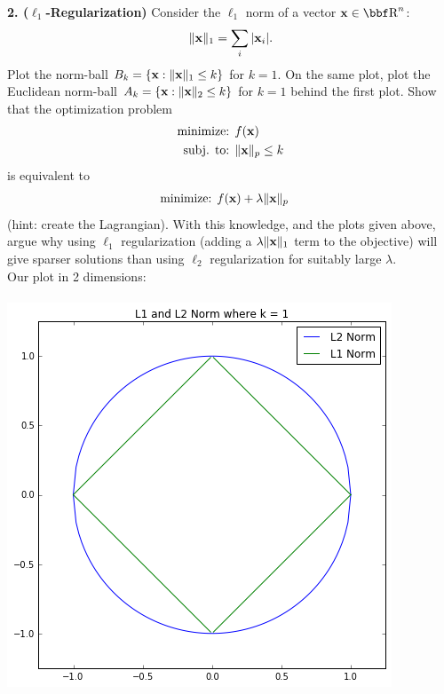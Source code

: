 \documentclass[12pt,letterpaper,fleqn]{hmcpset}
\begin{document}
\textbf{2. ($\ell_1$-Regularization)} Consider the $\ell_1$ norm of a vector $\xx\in\RR^n$:
\[
    \|{\bf x}\|_1 = \sum_i |{\bf x}_i|.
\]
Plot the norm-ball $B_k = \{{\bf x} : \|{\bf x}\|_1 \leq k\}$ for $k=1$. On the same plot, plot
the Euclidean norm-ball $A_k = \{{\bf x} : \|{\bf x}\|_2 \leq k\}$ for $k=1$ behind the first plot.
Show that the optimization problem
\begin{align*}
    \text{minimize: } & f({\bf x})\\
    \text{subj. to: } & \|{\bf x}\|_p \leq k
\end{align*}
is equivalent to
\begin{align*}
    \text{minimize: } & f({\bf x}) + \lambda\|{\bf x}\|_p
\end{align*}
(hint: create the Lagrangian). With this knowledge, and the plots given above, argue why
using $\ell_1$ regularization (adding a $\lambda\|{\bf x}\|_1$ term to the objective) will give
sparser solutions than using $\ell_2$ regularization for suitably large $\lambda$.\\[1em]

Our plot in 2 dimensions:\\\\
\includegraphics[scale = .5]{p2.png}\\
\end{document}
